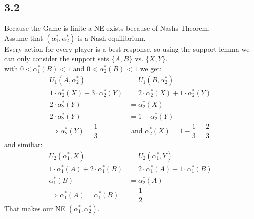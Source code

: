 \documentclass[a4paper,
  twoside, %
  headlines=2.1 %
  ]{scrartcl}
\begin{document}

\subsection*{3.2}
Because the Game is finite a NE exists because of Nashs Theorem.\\
Assume that $(\alpha_{1}^{*}, \alpha_{2}^{*})$ is a Nash equilibrium.\\
Every action for every player is a best response, so using the support lemma we can only consider the support sets $\{A,B\}$ vs. $\{X,Y\}$.\\
with $0 < \alpha_{1}^{*}(B) < 1$
and
$0 < \alpha_{2}^{*}(B) < 1$
we get:
\begin{align}
    U_1(A,\alpha_{2}^{*}) &= U_1(B, \alpha_{2}^{*}) \\
    1 \cdot \alpha_{2}^{*}(X) + 3 \cdot \alpha_{2}^{*}(Y) &= 2 \cdot \alpha_{2}^{*}(X) + 1 \cdot \alpha_{2}^{*}(Y) \\
    2 \cdot \alpha_{2}^{*}(Y) &= \alpha_{2}^{*}(X) \\
    2 \cdot \alpha_{2}^{*}(Y) &= 1 - \alpha_{2}^{*}(Y) \\
    \Rightarrow \alpha_{2}^{*}(Y) = \dfrac{1}{3} &\text{ and } \alpha_{2}^{*}(X) = 1 - \dfrac{1}{3} = \dfrac{2}{3}
\end{align}
and similiar:
\begin{align}
    U_2(\alpha_{1}^{*} ,X) &= U_2(\alpha_{1}^{*}, Y) \\
    1 \cdot \alpha_{1}^{*}(A) + 2 \cdot \alpha_{1}^{*}(B) &= 2 \cdot \alpha_{1}^{*}(A) + 1 \cdot \alpha_{1}^{*}(B) \\
    \alpha_{1}^{*}(B) &= \alpha_{2}^{*}(A) \\
    \Rightarrow \alpha_{1}^{*}(A) = \alpha_{1}^{*}(B) &= \dfrac{1}{2}
\end{align}
That makes our NE $(\alpha_{1}^{*}, \alpha_{2}^{*})$.
\end{document}
